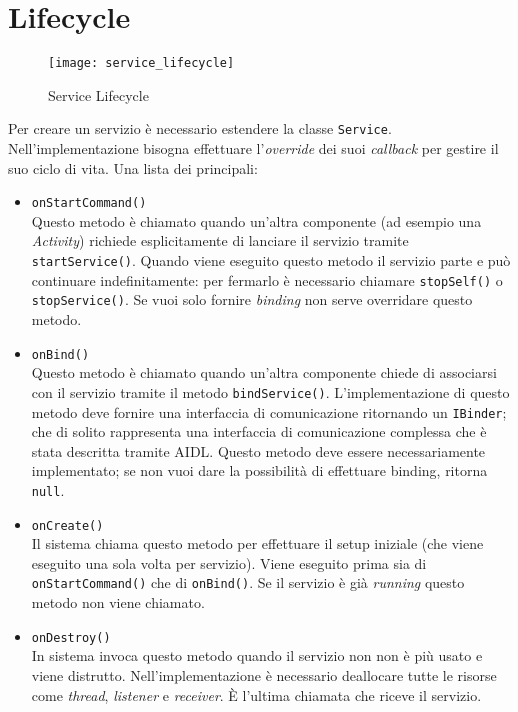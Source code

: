 \section{Lifecycle}
\begin{figure}
    \centering
    \texttt{[image: service\_lifecycle]}
    \caption{Service Lifecycle}
    \label{fig:my_label}
\end{figure}
Per creare un servizio è necessario estendere la classe \texttt{Service}. Nell'implementazione bisogna effettuare l'\textit{override} dei suoi \textit{callback} per gestire il suo ciclo di vita. Una lista dei principali:
\begin{itemize}
	\item \texttt{onStartCommand()}\\
	Questo metodo è chiamato quando un'altra componente (ad esempio una \textit{Activity}) richiede esplicitamente di lanciare il servizio tramite \texttt{startService()}. Quando viene eseguito questo metodo il servizio parte e può continuare indefinitamente: per fermarlo è necessario chiamare \texttt{stopSelf()} o \texttt{stopService()}. Se vuoi solo fornire \textit{binding} non serve overridare questo metodo.
	\item \texttt{onBind()}\\
	Questo metodo è chiamato quando un'altra componente chiede di associarsi con il servizio tramite il metodo \texttt{bindService()}. L'implementazione di questo metodo deve fornire una interfaccia di comunicazione ritornando un \texttt{IBinder}; che di solito rappresenta una interfaccia di comunicazione complessa che è stata descritta tramite AIDL. Questo metodo deve essere necessariamente implementato; se non vuoi dare la possibilità di effettuare binding, ritorna \texttt{null}.
	\item \texttt{onCreate()}\\
	Il sistema chiama questo metodo per effettuare il setup iniziale (che viene eseguito una sola volta per servizio). Viene eseguito prima sia di \texttt{onStartCommand()} che di \texttt{onBind()}. Se il servizio è già \textit{running} questo metodo non viene chiamato.
	\item \texttt{onDestroy()}\\
	In sistema invoca questo metodo quando il servizio non non è più usato e viene distrutto. Nell'implementazione è necessario deallocare tutte le risorse come \textit{thread}, \textit{listener} e \textit{receiver}. È l'ultima chiamata che riceve il servizio.
\end{itemize}

